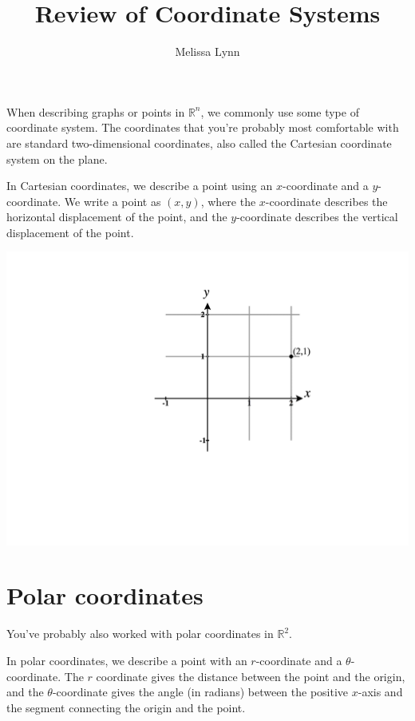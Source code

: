\documentclass{ximera}
\title{Review of Coordinate Systems}
\author{Melissa Lynn}
\begin{document}
\begin{abstract}
\end{abstract}
\maketitle

When describing graphs or points in $\mathbb{R}^n$, we commonly use some type of coordinate system. The coordinates that you're probably most comfortable with are standard two-dimensional coordinates, also called the Cartesian coordinate system on the plane.

In Cartesian coordinates, we describe a point using an $x$-coordinate and a $y$-coordinate. We write a point as $(x,y)$, where the $x$-coordinate describes the horizontal displacement of the point, and the $y$-coordinate describes the vertical displacement of the point.

\begin{image}
\includegraphics[width=\textwidth]{CalcPlot3D-2d_coords}
\end{image}

\section*{Polar coordinates}

You've probably also worked with polar coordinates in $\mathbb{R}^2$.

In polar coordinates, we describe a point with an $r$-coordinate and a $\theta$-coordinate. The $r$ coordinate gives the distance between the point and the origin, and the $\theta$-coordinate gives the angle (in radians) between the positive $x$-axis and the segment connecting the origin and the point.
\end{document}
